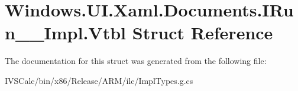 \hypertarget{struct_windows_1_1_u_i_1_1_xaml_1_1_documents_1_1_i_run_____impl_1_1_vtbl}{}\section{Windows.\+U\+I.\+Xaml.\+Documents.\+I\+Run\+\_\+\+\_\+\+Impl.\+Vtbl Struct Reference}
\label{struct_windows_1_1_u_i_1_1_xaml_1_1_documents_1_1_i_run_____impl_1_1_vtbl}


The documentation for this struct was generated from the following file\+:\begin{DoxyCompactItemize}
\item 
I\+V\+S\+Calc/bin/x86/\+Release/\+A\+R\+M/ilc/Impl\+Types.\+g.\+cs\end{DoxyCompactItemize}

